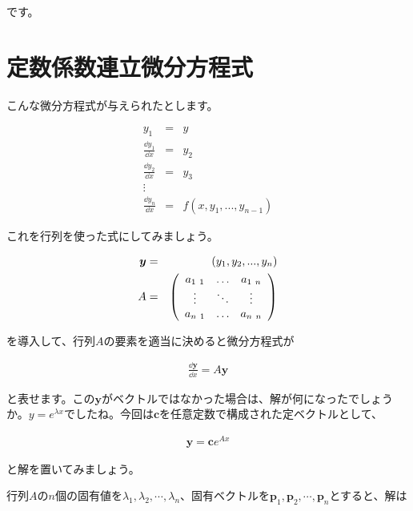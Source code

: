 \noindent
です。










\section{定数係数連立微分方程式}
\label{multiple}
こんな微分方程式が与えられたとします。

\begin{eqnarray}
y_1&=&y \nonumber \\
\frac{\dd y_1}{\dd x}&=&y_2 \nonumber \\
\frac{\dd y_2}{\dd x}&=&y_3 \nonumber \\
\vdots \nonumber\\
\frac{\dd y_n}{\dd x}&=&f(x,y_1,...,y_{n-1})
\end{eqnarray}

これを行列を使った式にしてみましょう。

\begin{eqnarray}
    \boldsymbol{y}&=&(y_1,y_2,...,y_n) \\
    A&=&\pqty{\begin{array}{ccc}
        a_{1\ 1} & \hdots & a_{1\ n} \\
        \vdots & \ddots & \vdots \\
        a_{n\ 1} & \hdots & a_{n\ n}
    \end{array}}
\end{eqnarray}

\noindent
を導入して、行列$A$の要素を適当に決めると微分方程式が

\begin{eqnarray}
    \frac{\dd \boldsymbol{y}}{\dd x}=A\boldsymbol{y}
    \label{eq:multiple-y}
\end{eqnarray}

\noindent
と表せます。この$\boldsymbol{y}$がベクトルではなかった場合は、解が何になったでしょうか。$y=e^{\lambda x}$でしたね。今回は$\boldsymbol{c}$を任意定数で構成された定ベクトルとして、

\begin{eqnarray}
    \boldsymbol{y}=\boldsymbol{c}e^{A x}
\end{eqnarray}

\noindent
と解を置いてみましょう。

行列$A$の$n$個の固有値を$\lambda_1,\lambda_2,\cdots,\lambda_n$、固有ベクトルを$\boldsymbol{p}_1,\boldsymbol{p}_2,\cdots,\boldsymbol{p}_n$とすると、解は

